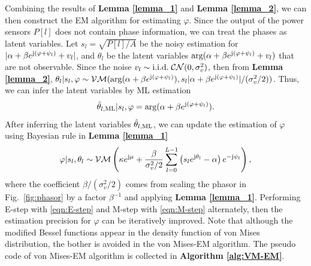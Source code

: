 \documentclass[conference,10pt,twocolumn]{IEEEtran}
\theoremstyle{nonumberplain}
\def \arg {\text{arg}}
\def \CN {\mathcal{CN}}
\def \VM {\mathcal{VM}}
\begin{document}
    Combining the results of {\bf Lemma \ref{lemma_1}} and {\bf Lemma \ref{lemma_2}}, we can then construct the EM algorithm for estimating $\varphi$. Since the output of the power sensors $P[l]$ does not contain phase information, we can treat the phases as latent variables. Let $s_l = \sqrt{P[l]/A}$ be the noisy estimation for $|\alpha + \beta e^{{\rm j} (\varphi + \psi_l)} + v_l|$, and $\theta_l$ be the latent variables $\arg (\alpha + \beta e^{{\rm j} (\varphi + \psi_l)} + v_l)$ that are not observable. 
    Since the noise $v_l \sim {\rm i.i.d.}\;\CN(0, \sigma_v^2)$, then from {\bf Lemma \ref{lemma_2}}, $\theta_l | s_l, \varphi \sim \VM(\arg(\alpha + \beta e^{{\rm j} (\varphi + \psi_l)}), s_l |\alpha + \beta e^{{\rm j} (\varphi + \psi_l)}|/(\sigma_v^2/2))$. Thus, we can infer the latent variables by ML estimation 
    \begin{equation}
        \hat{\theta}_{l, {\rm ML}} | s_l, \varphi = \arg(\alpha + \beta e^{{\rm j} (\varphi + \psi_l)}).
        \label{eqn:E-step}
    \end{equation}
    After inferring the latent variables $\hat{\theta}_{l, {\rm ML}}$, we can update the estimation of $\varphi$ using Bayesian rule in {\bf Lemma \ref{lemma_1}}
    \begin{equation}
        \varphi | s_l, \theta_l \sim \VM\left( \kappa e^{{\rm j} \mu} + \frac{\beta}{\sigma_v^2/2}\sum_{l=0}^{L-1}{\left(s_l e^{{\rm j}\theta_l}-\alpha\right)e^{-{\rm j} \psi_l}}\right),
        \label{eqn:M-step}
    \end{equation}
    where the coefficient $\beta/(\sigma_v^2/2)$ comes from scaling the phasor in Fig.~\ref{fig:phasor} by a factor $\beta^{-1}$ and applying {\bf Lemma \ref{lemma_1}}.
    Performing E-step with \eqref{eqn:E-step} and M-step with \eqref{eqn:M-step} alternately, then the estimation precision for $\varphi$ can be iteratively improved. Note that although the modified Bessel functions appear in the density function of von Mises distribution, the bother is avoided in the von Mises-EM algorithm. The pseudo code of von Mises-EM algorithm is collected in {\bf Algorithm \ref{alg:VM-EM}}.
\end{document}
